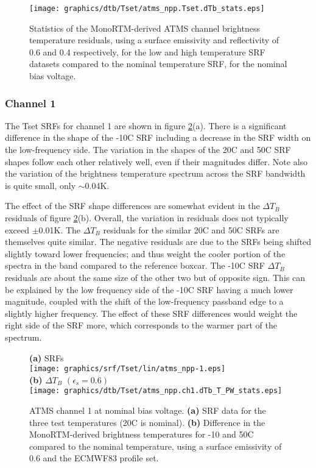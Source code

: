 \begin{figure}[H]
  \centering
    \texttt{[image: graphics/dtb/Tset/atms\_npp.Tset.dTb\_stats.eps]} 
  \caption{Statistics of the MonoRTM-derived ATMS channel brightness temperature residuals, using a surface emissivity and reflectivity of 0.6 and 0.4 respectively, for the low and high temperature SRF datasets compared to the nominal temperature SRF, for the nominal bias voltage.}
  \label{fig:Tset_dTb_stats}
\end{figure}



\subsubsection{Channel 1}
The Tset SRFs for channel 1 are shown in figure \ref{sec:rt.Tset_fig:atms_npp.Tset.ch1}(a). There is a significant difference in the shape of the -10\textdegree{}C SRF including a decrease in the SRF width on the low-frequency side. The variation in the shapes of the 20\textdegree{}C and 50\textdegree{}C SRF shapes follow each other relatively well, even if their magnitudes differ. Note also the variation of the brightness temperature spectrum across the SRF bandwidth is quite small, only $\sim$0.04K.

The effect of the SRF shape differences are somewhat evident in the $\Delta T_B$ residuals of figure \ref{sec:rt.Tset_fig:atms_npp.Tset.ch1}(b). Overall, the variation in residuals does not typically exceed $\pm$0.01K. The $\Delta T_B$ residuals for the similar 20\textdegree{}C and 50\textdegree{}C SRFs are themselves quite similar. The negative residuals are due to the SRFs being shifted slightly toward lower frequencies; and thus weight the cooler portion of the spectra in the band compared to the reference boxcar. The -10\textdegree{}C SRF $\Delta T_B$ residuals are about the same size of the other two but of opposite sign. This can be explained by the low frequency side of the -10\textdegree{}C SRF having a much lower magnitude, coupled with the shift of the low-frequency passband edge to a slightly higher frequency. The effect of these SRF differences would weight the right side of the SRF more, which corresponds to the warmer part of the spectrum.
\begin{figure}[H]
  \centering
  \hspace{-0.5cm}\textsf{\textbf{(a)} SRFs} \\
  \texttt{[image: graphics/srf/Tset/lin/atms\_npp-1.eps]} \\
  \hspace{-0.5cm}\textsf{\textbf{(b)} $\Delta T_B$ $(\epsilon_s = 0.6)$} \\
  \texttt{[image: graphics/dtb/Tset/atms\_npp.ch1.dTb\_T\_PW\_stats.eps]} 
  \caption{ATMS channel 1 at nominal bias voltage. \textbf{(a)} SRF data for the three test temperatures (20\textdegree{}C is nominal). \textbf{(b)} Difference in the MonoRTM-derived brightness temperatures for -10 and 50\textdegree{}C compared to the nominal temperature, using a surface emissivity of 0.6 and the ECMWF83 profile set.}
  \label{sec:rt.Tset_fig:atms_npp.Tset.ch1}
\end{figure}


